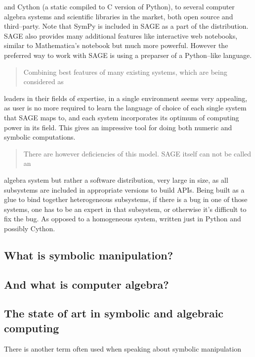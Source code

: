 and Cython (a static compiled to C version of Python), to several computer algebra
systems and scientific libraries in the market, both open source and third--party. Note
that SymPy is included in SAGE as a part of the distribution. SAGE also provides
many additional features like interactive web notebooks, similar to Mathematica's
notebook but much more powerful. However the preferred way to work with SAGE is
using a preparser of a Python--like language.
\begin{quote}

Combining best features of many existing systems, which are being considered as
\end{quote}

leaders in their fields of expertise, in a single environment seems very appealing, as
user is no more required to learn the language of choice of each single system that
SAGE maps to, and each system incorporates its optimum of computing power in its
field. This gives an impressive tool for doing both numeric and symbolic
computations.
\begin{quote}

There are however deficiencies of this model. SAGE itself can not be called an
\end{quote}

algebra system but rather a software distribution, very large in size, as all subsystems
are included in appropriate versions to build APIs. Being built as a glue to bind
together heterogeneous subsystems, if there is a bug in one of those systems, one has
to be an expert in that subsystem, or otherwise it's difficult to fix the bug. As opposed
to a homogeneous system, written just in Python and possibly Cython.


\subsection{What is symbolic manipulation?}


\subsection{And what is computer algebra?}


\subsection{The state of art in symbolic and algebraic computing}

There is another term often used when speaking about symbolic manipulation


